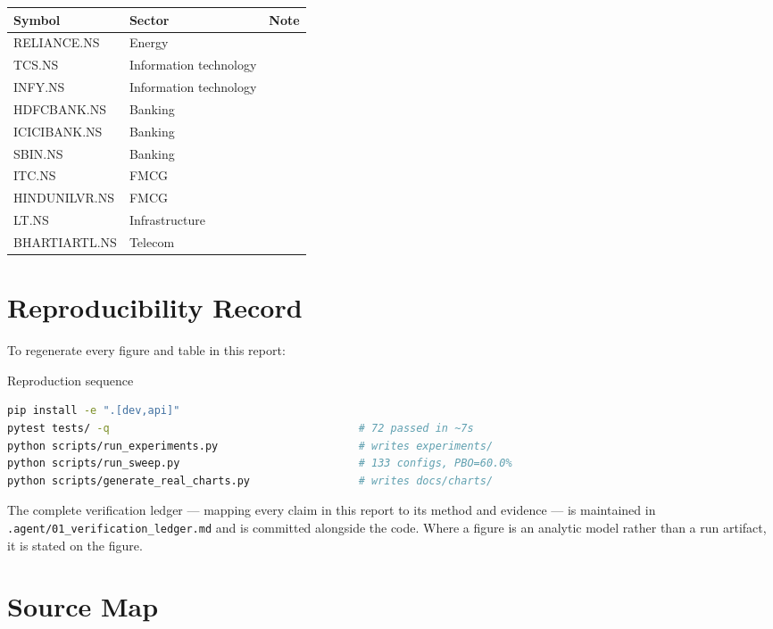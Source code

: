 \documentclass[12pt,a4paper,oneside]{report}
\begin{document}
\begin{center}
\begin{tabular}{@{}llp{6cm}@{}}
\toprule
\textbf{Symbol} & \textbf{Sector} & \textbf{Note} \\
\midrule
RELIANCE.NS & Energy & \\
TCS.NS & Information technology & \\
INFY.NS & Information technology & \\
HDFCBANK.NS & Banking & \\
ICICIBANK.NS & Banking & \\
SBIN.NS & Banking & \\
ITC.NS & FMCG & \\
HINDUNILVR.NS & FMCG & \\
LT.NS & Infrastructure & \\
BHARTIARTL.NS & Telecom & \\
\bottomrule
\end{tabular}
\end{center}

\chapter{Reproducibility Record}\label{app:repro}

To regenerate every figure and table in this report:

\begin{codebox}{Reproduction sequence}
\begin{lstlisting}[language=bash]
pip install -e ".[dev,api]"
pytest tests/ -q                                       # 72 passed in ~7s
python scripts/run_experiments.py                      # writes experiments/
python scripts/run_sweep.py                            # 133 configs, PBO=60.0%
python scripts/generate_real_charts.py                 # writes docs/charts/
\end{lstlisting}
\end{codebox}

The complete verification ledger --- mapping every claim in this report to its
method and evidence --- is maintained in \texttt{.agent/01\_verification\_ledger.md}
and is committed alongside the code. Where a figure is an analytic model rather
than a run artifact, it is stated on the figure.

\chapter{Source Map}
\end{document}
